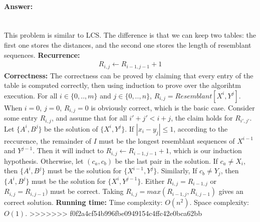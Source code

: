 \documentclass[11pt]{article}
\begin{document}
\paragraph{Answer: }\mbox{} \\
This problem is similar to LCS. The difference is that we can keep two tables: the first one stores the distances, and the second one stores the length of resemblant sequences. \newline
\textbf{Recurrence: }
\begin{gather*}
    R_{i,j} \gets R_{i-1,j-1} + 1
\end{gather*}
\textbf{Correctness: }The correctness can be proved by claiming that every entry of the table is computed correctly, then using induction to prove over the algorihtm execution. \newline
{}For all $i \in \{0,..,m\}$ and $j \in \{0,..,n\}$, $R_{i,j} = Resemblant[X^i, Y^j]$. \newline
{}\newline
When $i = 0$, $j = 0$, $R_{i,j} = 0$ is obviously correct, which is the basic case. Consider some entry $R_{i,j}$, and assume that for all $i' + j' < i + j$, the claim holds for $R_{i',j'}$. Let $\{A^i, B^j\}$ be the solution of $\{X^i, Y^j\}$. \newline
If $|x_i - y_j| \leq 1$, according to the reccurence, the remainder of $I$ must be the longest resemblant sequences of $X^{i-1}$ and $Y^{j-1}$. Then it will induct to $R_{i,j} \gets R_{i-1,j-1} + 1$, which is our induction hypothesis.
Otherwise, let $(c_a, c_b)$ be the last pair in the solution. If $c_a \neq X_i$, then $\{A^i, B^j\}$ must be the solution for $\{X^{i-1}, Y^j\}$. Similarly, If $c_b \neq Y_j$, then $\{A^i, B^j\}$ must be the solution for $\{X^i, Y^{j-1}\}$. Either $R_{i,j} = R_{i-1,j}$ or $R_{i,j} = R_{i,j-1})$ must be correct. Taking $R_{i,j} = max(R_{i-1,j}, R_{i,j-1})$ gives an correct solution. \newline
\textbf{Running time: }Time complexity: $O(n^2)$. Space complexity: $O(1)$.
>>>>>>> f0f2a4cf54b996fbe0949154c4ffc42e0bca62bb
\end{document}
